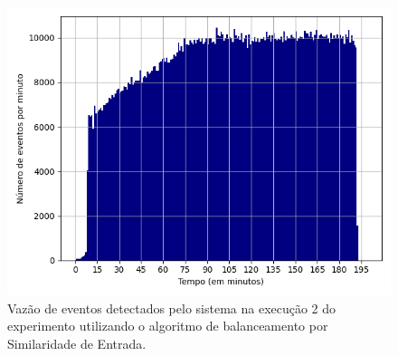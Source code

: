 


\begin{figure}[h]
\centering
\includegraphics[width=\textwidth]{figuras/graphics/histogram_vazao_7-dez-is.png}
\caption{Vazão de eventos detectados pelo sistema na execução 2 do experimento utilizando o algoritmo de balanceamento por Similaridade de Entrada.}
\label{fig:vazao_7-dez-is}
\end{figure}




